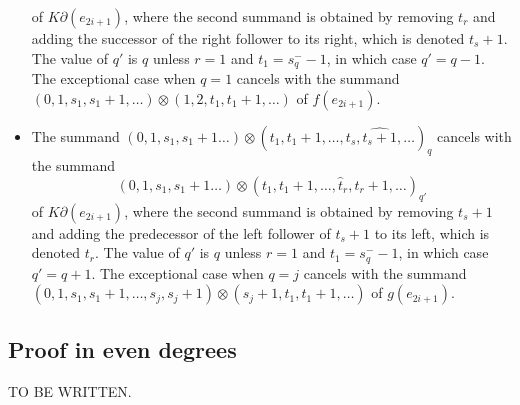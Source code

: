 \begin{itemize}
of $K\partial(e_{2i+1})$, where the second summand is obtained by removing $t_r$ and adding the successor of the right follower to its right, which is denoted $t_{s}+1$. The value of $q'$ is $q$ unless $r=1$ and $t_1 = s_q^--1$, in which case $q'=q-1$. The exceptional case when $q=1$ cancels with the summand $(0,1,s_1,s_1+1,\ldots)\otimes (1,2,t_1,t_1+1,\ldots)$ of $f(e_{2i+1})$.
\item The summand $(0,1,s_1,s_1+1\ldots)\otimes (t_1,t_1+1,\ldots,t_s,\widehat{t_s+1},\ldots)_q$ cancels with the summand
\[(0,1,s_1,s_1+1\ldots)\otimes (t_1,t_1+1,\ldots,\widehat{t}_r,t_r+1,\ldots)_{q'}\]
of $K\partial(e_{2i+1})$, where the second summand is obtained by removing $t_s+1$ and adding the predecessor of the left follower of $t_{s}+1$ to its left, which is denoted $t_{r}$. The value of $q'$ is $q$ unless $r=1$ and $t_1 = s_q^--1$, in which case $q'=q+1$. The exceptional case when $q=j$ cancels with the summand $(0,1,s_1,s_1+1,\ldots,s_j,s_j+1)\otimes(s_j+1,t_1,t_1+1,\ldots)$ of $g(e_{2i+1})$.
\end{itemize}
\subsection*{Proof in even degrees} TO BE WRITTEN.
